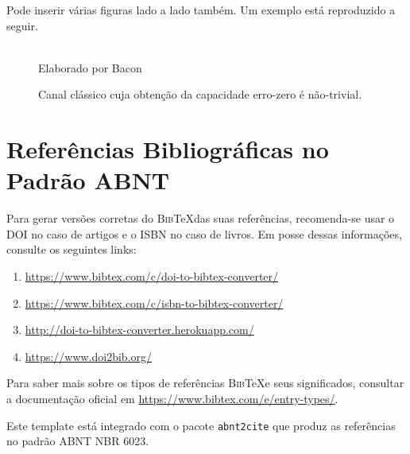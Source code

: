 Pode inserir várias figuras lado a lado também. Um exemplo está reproduzido a seguir.

\begin{figure}[H]
  \centering
  \caption{Canal clássico cuja obtenção da capacidade erro-zero é não-trivial.}
  \hspace{0.5cm}
  \hspace{0.5cm}
  \\
  \small{Elaborado por Bacon}
\end{figure}

\section{Referências Bibliográficas no Padrão ABNT}

Para gerar versões corretas do \textsc{Bib}\TeX das suas referências, recomenda-se usar o DOI no caso de artigos e o ISBN no caso de livros. Em posse dessas informações, consulte os seguintes links:

\begin{enumerate}
    \item \url{https://www.bibtex.com/c/doi-to-bibtex-converter/}
    \item \url{https://www.bibtex.com/c/isbn-to-bibtex-converter/}
    \item \url{http://doi-to-bibtex-converter.herokuapp.com/}
    \item \url{https://www.doi2bib.org/}
\end{enumerate}

Para saber mais sobre os tipos de referências \textsc{Bib}\TeX e seus significados, consultar a documentação oficial em \url{https://www.bibtex.com/e/entry-types/}.

Este template está integrado com o pacote \texttt{abnt2cite} que produz as referências no padrão ABNT NBR 6023.
